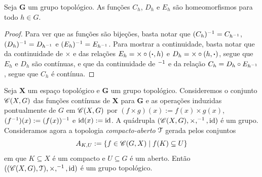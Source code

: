 \begin{prop}
Seja $\bm G$ um grupo topológico. As funções $C_h$, $D_h$ e $E_h$ são homeomorfismos para todo $h \in G$.
\end{prop}
\begin{proof}
Para ver que as funções são bijeções, basta notar que $(C_h)^{-1} = C_{h ^{-1}}$, $(D_h)^{-1} = D_{h ^{-1}}$ e $(E_h)^{-1} = E_{h ^{-1}}$. Para mostrar a continuidade, basta notar que da continuidade de $\times$ e das relações $E_h = \times \circ (\bm{\bm{\cdot}},h)$ e $D_h = \times \circ (h,\bm{\bm{\cdot}})$, segue que $E_h$ e $D_h$ são contínuas, e que da continuidade de $^{-1}$ e da relação $C_h = D_h \circ E_{h^{-1}}$, segue que $C_h$ é contínua.
\end{proof}

\begin{ex}
Seja $\bm X$ um espaço topológico e $\bm G$ um grupo topológico. Consideremos o conjunto $\mathscr{C}(X,G)$ das funções contínuas de $\bm X$ para $\bm G$ e as operações induzidas pontualmente de $G$ em $\mathscr{C}(X,G)$ por $(f \times g)(x) := f(x) \times g(x)$, $(f^{-1})(x) := (f(x))^{-1}$ e $\mathrm{id}(x) := \mathrm{id}$. A quádrupla $(\mathscr{C}(X,G),\times,^{-1},\mathrm{id})$ é um grupo. Consideramos agora a topologia \emph{compacto-aberto} $\mathcal{T}$ gerada pelos conjuntos
	\begin{equation*}
	A_{K,U} := \left\{f \in \mathscr{C}(G,X) \;\middle\vert\; f(K) \subseteq U \right\}
	\end{equation*}
em que $K \subseteq X$ é um compacto e $U \subseteq G$ é um aberto. Então $((\mathscr{C}(X,G),\mathcal{T}),\times,^{-1},\mathrm{id})$ é um grupo topológico.
\end{ex}

